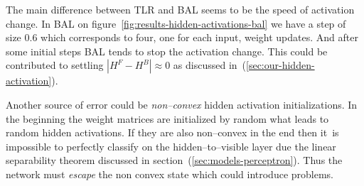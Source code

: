 The main difference between TLR and BAL seems to be the speed of activation change. In BAL on figure~\ref{fig:results-hidden-activations-bal} we have a step of size 0.6 which corresponds to four, one for each input, weight updates. And after some initial steps BAL tends to stop the activation change. This could be contributed to settling $|H^F-H^B| \approx 0$ as discussed in~(\ref{sec:our-hidden-activation}). 

Another source of error could be \emph{non--convex} hidden activation initializations. In the beginning the weight matrices are initialized by random what leads to random hidden activations. If they are also non--convex in the end then it~is impossible to perfectly classify on the hidden--to--visible layer due the linear separability theorem discussed in section~(\ref{sec:models-perceptron}). Thus the network must \emph{escape} the non convex state which could introduce problems. 



